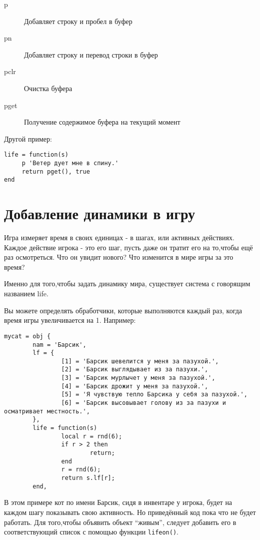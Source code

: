 \documentclass[a4paper,12pt]{article}
\begin{document}
\begin{description}
\item[p] Добавляет строку и пробел в буфер
\item[pn] Добавляет строку и перевод строки в буфер
\item[pclr] Очистка буфера
\item[pget] Получение содержимое буфера на текущий момент
\end{description}

Другой пример:

\begin{verbatim}
life = function(s)
     p 'Ветер дует мне в спину.'
     return pget(), true
end
\end{verbatim}

\section{Добавление динамики в игру}

Игра измеряет время в своих единицах - в шагах, или активных действиях. Каждое действие игрока - это его шаг, пусть даже он тратит его на то,чтобы ещё раз осмотреться. Что он увидит нового? Что изменится в мире игры за это время?

Именно для того,чтобы задать динамику мира, существует система с говорящим названием life.

Вы можете определять обработчики, которые выполняются каждый раз, когда время игры увеличивается на 1. Например:

\begin{verbatim}
mycat = obj {
        nam = 'Барсик',
        lf = {
                [1] = 'Барсик шевелится у меня за пазухой.',
                [2] = 'Барсик выглядывает из за пазухи.',
                [3] = 'Барсик мурлычет у меня за пазухой.',
                [4] = 'Барсик дрожит у меня за пазухой.',
                [5] = 'Я чувствую тепло Барсика у себя за пазухой.',
                [6] = 'Барсик высовывает голову из за пазухи и осматривает местность.',
        },
        life = function(s)
                local r = rnd(6);
                if r > 2 then
                        return;
                end
                r = rnd(6);
                return s.lf[r];
        end,
\end{verbatim}

В этом примере кот по имени Барсик, сидя в инвентаре у игрока, будет на каждом шагу показывать свою активность. Но приведённый код пока что не будет работать. Для того,чтобы объявить объект ``живым'', следует добавить его в соответствующий список с помощью функции \verb/lifeon()/. 
\end{document}
